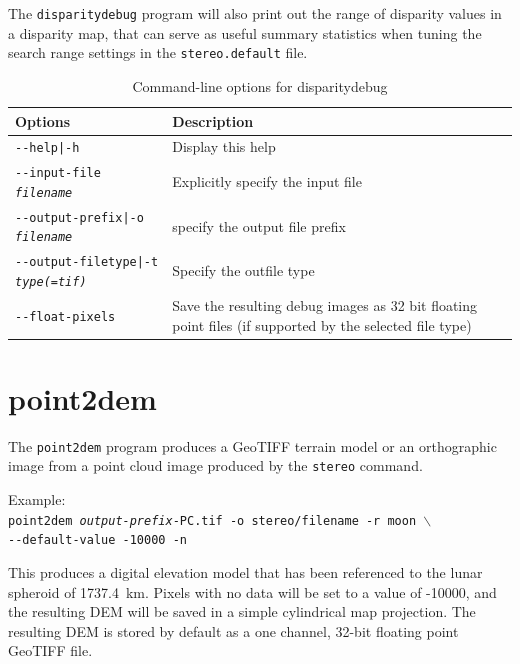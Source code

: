 The {\tt disparitydebug} program will also print out the range of
disparity values in a disparity map, that can serve as useful summary
statistics when tuning the search range settings in the
{\tt stereo.default} file.

\begin{longtable}{|l|p{10cm}|}
\caption{Command-line options for disparitydebug}
\label{tbl:disparitydebug}
\endfirsthead
\endhead
\endfoot
\endlastfoot
\hline
Options & Description \\ \hline \hline
\texttt{-\/-help|-h} & Display this help\\ \hline
\texttt{-\/-input-file \textit{filename}} & Explicitly specify the input file \\ \hline
\texttt{-\/-output-prefix|-o \textit{filename}} & specify the output file prefix \\ \hline
\texttt{-\/-output-filetype|-t \textit{type(=tif)}} & Specify the outfile type \\ \hline
\texttt{-\/-float-pixels} & Save the resulting debug images as 32 bit floating point files (if supported by the selected file type) \\ \hline
\end{longtable}


\section{point2dem}
\label{point2dem}

The \texttt{point2dem} program produces a GeoTIFF terrain model or an orthographic image from a point cloud image produced by the {\tt stereo} command.

Example:\\
\hspace*{2em}\texttt{point2dem \textit{output-prefix}-PC.tif -o stereo/filename -r moon $\backslash$} \\
\hspace*{4em}\texttt{-\/-default-value -10000 -n}

This produces a digital elevation model that has been referenced to
the lunar spheroid of 1737.4~km.  Pixels with no data will be set to a
value of -10000, and the resulting \ac{DEM} will be saved in a simple
cylindrical map projection.  The resulting \ac{DEM} is stored by default as
a one channel, 32-bit floating point GeoTIFF file.

